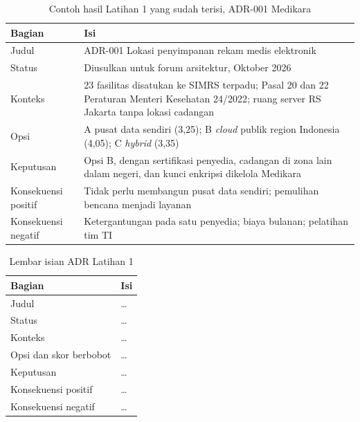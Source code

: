 \begin{table}[!htb]
  \centering
  \caption{Contoh hasil Latihan 1 yang sudah terisi, ADR-001 Medikara}
  \label{tab:ch10-lat1-contoh}
  \small
  \begin{tabularx}{\textwidth}{lX}
    \hline
    \textbf{Bagian} & \textbf{Isi} \\
    \hline
    Judul & ADR-001 Lokasi penyimpanan rekam medis elektronik \\
    \hline
    Status & Diusulkan untuk forum arsitektur, Oktober 2026 \\
    \hline
    Konteks & 23 fasilitas disatukan ke SIMRS terpadu; Pasal 20 dan 22 Peraturan Menteri Kesehatan 24/2022; ruang server RS Jakarta tanpa lokasi cadangan \\
    \hline
    Opsi & A pusat data sendiri (3,25); B \textit{cloud} publik region Indonesia (4,05); C \textit{hybrid} (3,35) \\
    \hline
    Keputusan & Opsi B, dengan sertifikasi penyedia, cadangan di zona lain dalam negeri, dan kunci enkripsi dikelola Medikara \\
    \hline
    Konsekuensi positif & Tidak perlu membangun pusat data sendiri; pemulihan bencana menjadi layanan \\
    \hline
    Konsekuensi negatif & Ketergantungan pada satu penyedia; biaya bulanan; pelatihan tim TI \\
    \hline
  \end{tabularx}
\end{table}

\begin{table}[!htb]
  \centering
  \caption{Lembar isian ADR Latihan 1}
  \label{tab:ch10-lat1-hasil}
  \small
  \begin{tabularx}{\textwidth}{lX}
    \hline
    \textbf{Bagian} & \textbf{Isi} \\
    \hline
    Judul & \dots \\
    \hline
    Status & \dots \\
    \hline
    Konteks & \dots \\
    \hline
    Opsi dan skor berbobot & \dots \\
    \hline
    Keputusan & \dots \\
    \hline
    Konsekuensi positif & \dots \\
    \hline
    Konsekuensi negatif & \dots \\
    \hline
  \end{tabularx}
\end{table}


